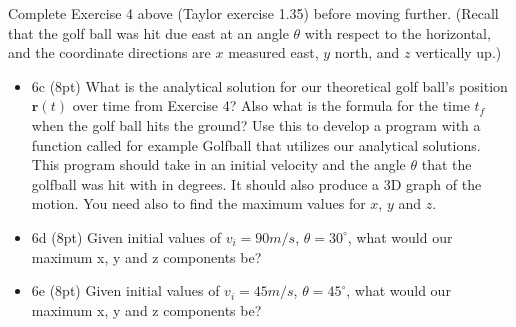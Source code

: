 \documentclass[%
oneside,                 %
final,                   %
10pt]{article}
\begin{document}
\noindent
Complete Exercise 4 above (Taylor exercise 1.35) before moving further. (Recall that the golf ball was hit due east at an angle $\theta$ with respect to the horizontal, and the coordinate directions are $x$ measured east, $y$ north, and $z$ vertically up.)

\begin{itemize}
\item 6c (8pt) What is the analytical solution for our theoretical golf ball's position $\bm{r}(t)$ over time from Exercise 4?  Also what is the formula for the time $t_f$ when the golf ball hits the ground? Use this to develop a program with a function called for example Golfball that utilizes our analytical solutions. This program should take in an initial velocity and the angle $\theta$ that the golfball was hit with in degrees. It should also produce  a 3D graph of the motion. You need also to find the maximum values for $x$, $y$ and $z$.

\item 6d (8pt) Given initial values of $v_i = 90 m/s$, $\theta = 30^{\circ}$, what would our maximum x, y and z components be? 

\item 6e (8pt) Given initial values of $v_i = 45 m/s$, $\theta = 45^{\circ}$, what would our maximum x, y and z components be? 
\end{itemize}

\noindent


\end{document}
